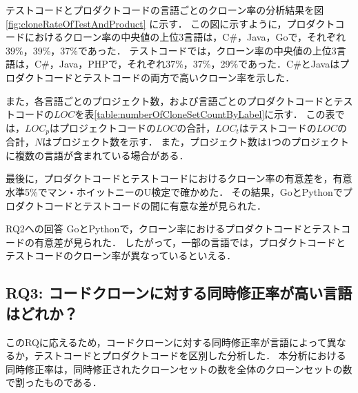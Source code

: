 \documentclass[T,J]{fose}
\begin{document}
テストコードとプロダクトコードの言語ごとのクローン率の分析結果を図\ref{fig:cloneRateOfTestAndProduct} に示す．
この図に示すように，プロダクトコードにおけるクローン率の中央値の上位3言語は，C\#，Java，Goで，それぞれ39\%，39\%，37\%であった．
テストコードでは，クローン率の中央値の上位3言語は，C\#，Java，PHPで，それぞれ37\%，37\%，29\%であった．C\#とJavaはプロダクトコードとテストコードの両方で高いクローン率を示した．

また，各言語ごとのプロジェクト数，および言語ごとのプロダクトコードとテストコードの$LOC$を表\ref{table:numberOfCloneSetCountByLabel}に示す．
この表では，$LOC_p$はプロジェクトコードの$LOC$の合計，$LOC_t$はテストコードの$LOC$の合計，$N$はプロジェクト数を示す．
また，プロジェクト数は1つのプロジェクトに複数の言語が含まれている場合がある．

最後に，プロダクトコードとテストコードにおけるクローン率の有意差を，有意水準5\%でマン・ホイットニーのU検定で確かめた．
その結果，GoとPythonでプロダクトコードとテストコードの間に有意な差が見られた．


\begin{itembox}[l]{RQ2への回答}
GoとPythonで，クローン率におけるプロダクトコードとテストコードの有意差が見られた．
したがって，一部の言語では，プロダクトコードとテストコードのクローン率が異なっているといえる．
\end{itembox}


\subsection{RQ3: コードクローンに対する同時修正率が高い言語はどれか？}
このRQに応えるため，コードクローンに対する同時修正率が言語によって異なるか，テストコードとプロダクトコードを区別した分析した．
本分析における同時修正率は，同時修正されたクローンセットの数を全体のクローンセットの数で割ったものである．
\end{document}
